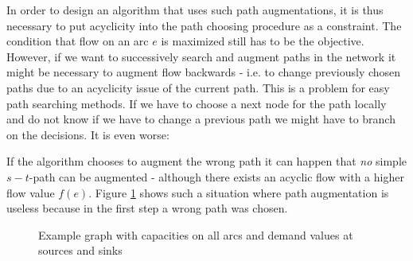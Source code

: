 In order to design an algorithm that uses such path augmentations, it is thus necessary to put acyclicity into the path 
choosing procedure as a constraint. The condition that flow on an arc $e$ is maximized still has to be the objective.
However, if we want to successively search and augment paths in the network it might be necessary to augment flow 
backwards - i.e. to change previously chosen paths due to an acyclicity issue of the current path.
This is a problem for easy path searching methods. If we have to choose a next node for the path locally and do not 
know if we have to change a previous path we might have to branch on the decisions. It is even worse: 

If the algorithm chooses to augment the wrong path it can happen that \textit{no} simple $s-t$-path can be augmented -
although there exists an acyclic flow with a higher flow value $f(e)$. Figure \ref{bild:blockingPathflowNet} shows such 
a situation where path augmentation is useless because in the first step a wrong path was chosen. 

\begin{figure}[h!]
\centering
{}
\caption{Example graph with capacities on all arcs and demand values at sources and sinks}
 \label{bild:blockingPathflowNet}
\end{figure}

